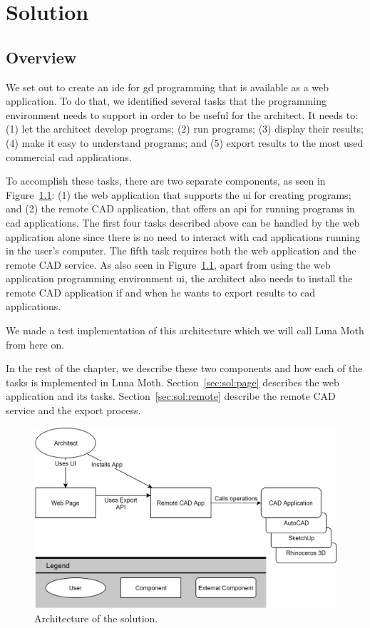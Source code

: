 
\chapter{Solution}
\label{chapter:solution}


\section{Overview}
We set out to create an \gls{ide} for \gls{gd} programming that is available as a web application.
To do that, we identified several tasks that the programming environment needs to support in order to be useful for the architect.
It needs to:
(1) let the architect develop programs;
(2) run programs;
(3) display their results;
(4) make it easy to understand programs;
and (5) export results to the most used commercial \gls{cad} applications.

To accomplish these tasks, there are two separate components, as seen in Figure~\ref{fig:archi:sol}: (1) the web application that supports the \gls{ui} for creating programs; and (2) the remote CAD application, that offers an \gls{api} for running programs in \gls{cad} applications.
The first four tasks described above can be handled by the web application alone since there is no need to interact with \gls{cad} applications running in the user's computer.
The fifth task requires both the web application and the remote CAD service.
As also seen in Figure~\ref{fig:archi:sol}, apart from using the web application programming environment \gls{ui}, the architect also needs to install the remote CAD application if and when he wants to export results to \gls{cad} applications.

We made a test implementation of this architecture which we will call Luna Moth from here on.

In the rest of the chapter, we describe these two components and how each of the tasks is implemented in Luna Moth.
Section~\ref{sec:sol:page} describes the web application and its tasks.
Section~\ref{sec:sol:remote} describe the remote CAD service and the export process.

\begin{figure}
  \centering
  \includegraphics[width=1.0\textwidth]{./images/architecture_overview/architecture_overview}
  \caption{Architecture of the solution.}
  \label{fig:archi:sol}
\end{figure}


